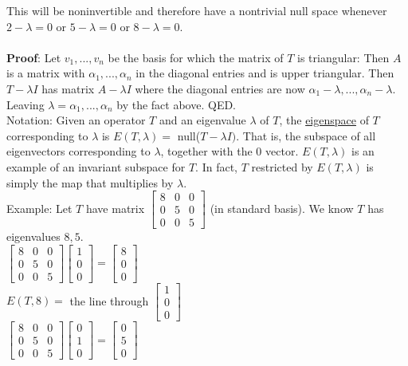\documentclass{article}
\begin{document}
This will be noninvertible and therefore have a nontrivial null space whenever $2 - \lambda = 0$ or $5 - \lambda = 0$ or $8 - \lambda = 0$. \\\\
\textbf{Proof}: Let $v_1, ..., v_n$ be the basis for which the matrix of $T$ is triangular: Then $A$ is a matrix with $\alpha_1,...,\alpha_n$ in the diagonal entries and is upper triangular. Then $T-\lambda I$ has matrix $A - \lambda I$ where the diagonal entries are now $\alpha_1 - \lambda,..., \alpha_n - \lambda$. Leaving $\lambda = \alpha_1, ..., \alpha_n$ by the fact above. QED. \\
Notation: Given an operator $T$ and an eigenvalue $\lambda$ of $T$, the \underline{eigenspace} of $T$ corresponding to $\lambda$ is $E(T, \lambda) =$ null($T-\lambda I)$. That is, the subspace of all eigenvectors corresponding to $\lambda$, together with the $0$ vector. $E(T, \lambda)$ is an example of an invariant subspace for $T$. In fact, $T$ restricted by $E(T, \lambda)$ is simply the map that multiplies by $\lambda$. \\
Example: Let $T$ have matrix $\begin{bmatrix}
    8&0&0\\0&5&0\\0&0&5
\end{bmatrix}$ (in standard basis). We know $T$ has eigenvalues $8,5$. \\ $\begin{bmatrix}
    8&0&0\\0&5&0\\0&0&5
\end{bmatrix} \begin{bmatrix}
    1\\0\\0
\end{bmatrix} = \begin{bmatrix}
    8\\0\\0
\end{bmatrix}$\\
$E(T,8) =$ the line through $\begin{bmatrix}
    1\\0\\0
\end{bmatrix}$\\
$\begin{bmatrix}
    8&0&0\\0&5&0\\0&0&5
\end{bmatrix} \begin{bmatrix}
    0\\1\\0
\end{bmatrix} = \begin{bmatrix}
    0\\5\\0
\end{bmatrix}$\\
\end{document}
